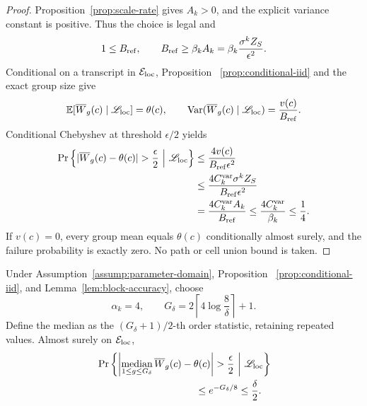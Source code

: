 \begin{proof}
Proposition~\ref{prop:scale-rate} gives $A_k>0$, and the explicit variance
constant is positive.  Thus the choice is legal and
\[
 1\leq B_{\rm ref},
 \qquad B_{\rm ref}\geq\beta_kA_k
 =\beta_k\frac{\sigma^kZ_S}{\epsilon^2}.
\]
Conditional on a transcript in $\mathcal E_{\rm loc}$, Proposition~
\ref{prop:conditional-iid} and the exact group size give
\[
 \mathbb E[\overline W_g(c)\mid\mathscr L_{\rm loc}]=\theta(c),
 \qquad
 \operatorname{Var}(\overline W_g(c)\mid\mathscr L_{\rm loc})
 =\frac{v(c)}{B_{\rm ref}}.
\]
Conditional Chebyshev at threshold $\epsilon/2$ yields
\[
\begin{aligned}
 \Pr\left\{|\overline W_g(c)-\theta(c)|>\frac\epsilon2
 \ \middle|\ \mathscr L_{\rm loc}\right\}
 &\leq\frac{4v(c)}{B_{\rm ref}\epsilon^2}\\
 &\leq\frac{4C_k^{\rm var}\sigma^kZ_S}
 {B_{\rm ref}\epsilon^2}\\
 &=\frac{4C_k^{\rm var}A_k}{B_{\rm ref}}
 \leq\frac{4C_k^{\rm var}}{\beta_k}\leq\frac14.
\end{aligned}
\]
If $v(c)=0$, every group mean equals $\theta(c)$ conditionally almost surely,
and the failure probability is exactly zero.  No path or cell union bound is
taken.
\end{proof}

\begin{lemma}
\label{lem:median-amplification}
Under Assumption~\ref{assump:parameter-domain}, Proposition~
\ref{prop:conditional-iid}, and Lemma~\ref{lem:block-accuracy}, choose
\[
 \alpha_k=4,
 \qquad G_\delta=2\left\lceil4\log\frac8\delta\right\rceil+1.
\]
Define the median as the $(G_\delta+1)/2$-th order statistic, retaining
repeated values.  Almost surely on $\mathcal E_{\rm loc}$,
\[
\begin{aligned}
 &\Pr\left\{
 \left|\mathop{\rm median}_{1\leq g\leq G_\delta}\overline W_g(c)
 -\theta(c)\right|>\frac\epsilon2
 \ \middle|\ \mathscr L_{\rm loc}\right\}\\
 &\hspace{10em}\leq e^{-G_\delta/8}\leq\frac\delta2.
\end{aligned}
\]
\end{lemma}

